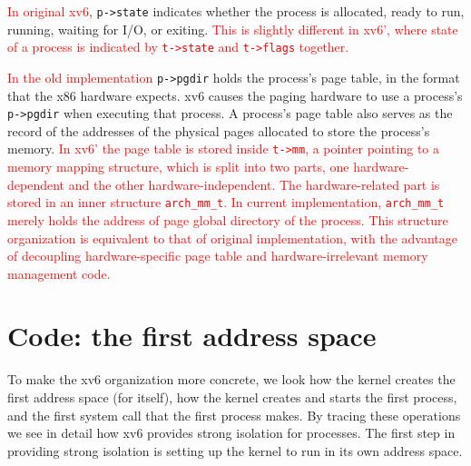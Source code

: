 \documentclass{report}
\begin{document}
	\textcolor{red}{In original xv6}, \texttt{p->state} indicates whether the process is 
	allocated, ready to run, running, waiting for I/O, or exiting.  \textcolor{red}{
		This is slightly different in xv6', where state of a process is indicated by
		\texttt{t->state} and \texttt{t->flags} together.
	}
	
	\textcolor{red}{In the old implementation} \texttt{p->pgdir} holds the process's page table, 
	in the format that the x86 hardware expects. xv6 causes the paging hardware to use a 
	process's \texttt{p->pgdir} when executing
	that process. A process's page table also serves as the record of the addresses of the
	physical pages allocated to store the process's memory.  \textcolor{red}{
		In xv6' the page table is stored inside \texttt{t->mm}, a pointer pointing to a memory 
		mapping structure, which is split into two parts, one hardware-dependent and the other
		hardware-independent.  The hardware-related part is stored in an inner structure
		 \texttt{arch\_mm\_t}.  In current implementation,
		\texttt{arch\_mm\_t} merely holds the address of page global directory of the process.
		This structure organization is equivalent to that of original implementation, with the
		advantage of decoupling hardware-specific page table and hardware-irrelevant memory
		management code.
	}
	
	\section{Code: the first address space}
	To make the xv6 organization more concrete, we look how the kernel creates the first
	address space (for itself), how the kernel creates and starts the first process, and the
	first system call that the first process makes. By tracing these operations we see in detail
	how xv6 provides strong isolation for processes. The first step in providing strong 
	isolation is setting up the kernel to run in its own address space.
	
\end{document}
